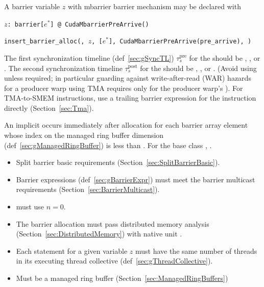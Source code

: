 
A barrier variable $z$ with mbarrier barrier mechanism may be declared with

\texttt{$z$: barrier[$e^*$] @ CudaMbarrierPreArrive()}

\texttt{insert\_barrier\_alloc(, $z$, [$e^*$], CudaMbarrierPreArrive(pre\_arrive), )}

The first synchronization timeline (def~\ref{sec:gSyncTL}) $\tau_s^\mathrm{pre}$ for the  should be , , or .
The second synchronization timeline $\tau_s^\mathrm{post}$ for the  should be , , or .
(Avoid using  unless required; in particular guarding against write-after-read (WAR) hazards for a producer warp using TMA requires only  for the producer warp's ).
For TMA-to-SMEM instructions, use a trailing barrier expression for the instruction directly (Section~\ref{sec:Tma}).

An implicit  occurs immediately after allocation for each barrier array element whose index on the managed ring buffer dimension (def~\ref{sec:gManagedRingBuffer}) is less than .
For the base class , .

\begin{itemize}
  \item Split barrier basic requirements (Section~\ref{sec:SplitBarrierBasic}).
  \item Barrier expressions (def~\ref{sec:gBarrierExpr}) must meet the barrier multicast requirements (Section~\ref{sec:BarrierMulticast}).
  \item {} must use $n = 0$.
  \item The barrier allocation must pass distributed memory analysis (Section~\ref{sec:DistributedMemory}) with native unit .
  \item Each  statement for a given variable $z$ must have the same number of threads in its executing thread collective (def~\ref{sec:gThreadCollective}).
  \item Must be a managed ring buffer (Section~\ref{sec:ManagedRingBuffers})
\end{itemize}

